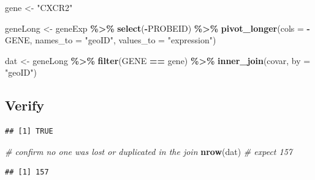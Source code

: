 \documentclass[
]{article}
\newenvironment{Shaded}{\begin{snugshade}}{\end{snugshade}}
\newcommand{\AttributeTok}[1]{\textcolor[rgb]{0.13,0.29,0.53}{#1}}
\newcommand{\CommentTok}[1]{\textcolor[rgb]{0.56,0.35,0.01}{\textit{#1}}}
\newcommand{\FunctionTok}[1]{\textcolor[rgb]{0.13,0.29,0.53}{\textbf{#1}}}
\newcommand{\NormalTok}[1]{#1}
\newcommand{\OtherTok}[1]{\textcolor[rgb]{0.56,0.35,0.01}{#1}}
\newcommand{\SpecialCharTok}[1]{\textcolor[rgb]{0.81,0.36,0.00}{\textbf{#1}}}
\newcommand{\StringTok}[1]{\textcolor[rgb]{0.31,0.60,0.02}{#1}}
\begin{document}
\begin{Shaded}
\begin{Highlighting}[]
\NormalTok{gene }\OtherTok{\textless{}{-}} \StringTok{"CXCR2"}

\NormalTok{geneLong }\OtherTok{\textless{}{-}}\NormalTok{ geneExp }\SpecialCharTok{\%\textgreater{}\%}
  \FunctionTok{select}\NormalTok{(}\SpecialCharTok{{-}}\NormalTok{PROBEID) }\SpecialCharTok{\%\textgreater{}\%}
  \FunctionTok{pivot\_longer}\NormalTok{(}\AttributeTok{cols =} \SpecialCharTok{{-}}\NormalTok{GENE, }\AttributeTok{names\_to =} \StringTok{"geoID"}\NormalTok{, }\AttributeTok{values\_to =} \StringTok{"expression"}\NormalTok{)}

\NormalTok{dat }\OtherTok{\textless{}{-}}\NormalTok{ geneLong }\SpecialCharTok{\%\textgreater{}\%}
  \FunctionTok{filter}\NormalTok{(GENE }\SpecialCharTok{==}\NormalTok{ gene) }\SpecialCharTok{\%\textgreater{}\%}
  \FunctionTok{inner\_join}\NormalTok{(covar, }\AttributeTok{by =} \StringTok{"geoID"}\NormalTok{)}
\end{Highlighting}
\end{Shaded}

\subsection{Verify}\label{verify}

\begin{Shaded}
\end{Shaded}

\begin{verbatim}
## [1] TRUE
\end{verbatim}

\begin{Shaded}
\begin{Highlighting}[]
\CommentTok{\# confirm no one was lost or duplicated in the join}
\FunctionTok{nrow}\NormalTok{(dat)                        }\CommentTok{\# expect 157}
\end{Highlighting}
\end{Shaded}

\begin{verbatim}
## [1] 157
\end{verbatim}
\end{document}
